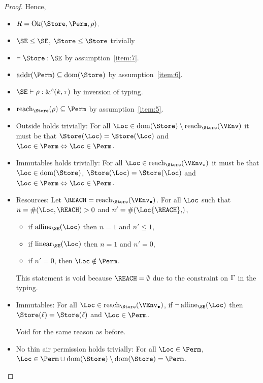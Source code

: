 \begin{proof}
  Hence,
  \begin{itemize}
  \item $R=\Ok{\Store, \Perm, \rho}$.
  \item $\SE \le \SE$, $\Store \le \Store$ trivially
  \item $\vdash \Store : \SE$ by assumption~\ref{item:7}.
  \item $\Addresses{\Perm} \subseteq \Dom{\Store}$ by
    assumption~\ref{item:6}.
  \item $\SE \vdash \rho : \borrowty{k}{\tau}$ by inversion of typing.
  \item $\Reach{\Store}{\rho} \subseteq \Perm$ by assumption~\ref{item:5}.
  \item Outside holds trivially: For all $\Loc \in \Dom{\Store} \setminus
    \Reach{\Store}{\VEnv}$ it must be that
    $\Store (\Loc) = \Store (\Loc)$
    and $\Loc\in\Perm \Leftrightarrow \Loc\in\Perm$.
  \item Immutables holds trivially: For all $\Loc \in
    \Reach{\Store}{\ImmutableBorrows\VEnv}$ it must be that
    $\Loc\in\Dom\Store$,
    $\Store (\Loc) = \Store (\Loc)$
    and $\Loc\in\Perm \Leftrightarrow \Loc\in\Perm$.
  \item Resources:
    Let $\REACH =\Reach{\Store}{\Active\VEnv}$.
    For all $\Loc$ such that $n= \MultiNumber\Loc\REACH >0$ and $n' =
    \MultiNumber\Loc{\REACH}$,
    \begin{itemize}
    \item if $\Affine{\SE}\Loc$ then $n=1$ and $n'\le 1$,
    \item if $\Linear{\SE}\Loc$ then $n=1$ and $n' = 0$,
    \item if $n'=0$, then $\Loc\notin\Perm$.
    \end{itemize}

    This statement is void because $\REACH=\emptyset$ due to the
    constraint on $\Gamma$ in the typing.
  \item Immutables: For all $\Loc \in \Reach
    {\Store}{\Active\VEnv}$, if $\neg\Writeable{\SE}\Loc$ then
    $\Store (\ell) = \Store (\ell)$ and $\Loc\in \Perm$.

    Void for the same reason as before.
  \item No thin air permission holds trivially: For all $\Loc\in \Perm$, $\Loc
    \in \Perm \cup  \Dom{\Store} \setminus \Dom{\Store} = \Perm$.
  \end{itemize}


\end{proof}

